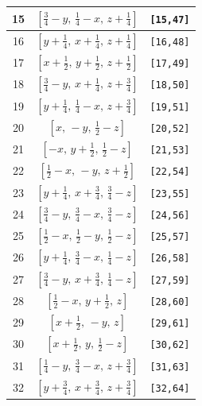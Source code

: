\documentclass[fleqn,8pt]{jsarticle}
\begin{document}
\begin{longtable}{ccc}
15 & $\left[ \frac{3}{4} - y,\, \frac{1}{4} - x,\, z + \frac{1}{4} \right]$ & {\tt [15,47]} \\ \hline
16 & $\left[ y + \frac{1}{4},\, x + \frac{1}{4},\, z + \frac{1}{4} \right]$ & {\tt [16,48]} \\ \hline
17 & $\left[ x + \frac{1}{2},\, y + \frac{1}{2},\, z + \frac{1}{2} \right]$ & {\tt [17,49]} \\ \hline
18 & $\left[ \frac{3}{4} - y,\, x + \frac{1}{4},\, z + \frac{3}{4} \right]$ & {\tt [18,50]} \\ \hline
19 & $\left[ y + \frac{1}{4},\, \frac{1}{4} - x,\, z + \frac{3}{4} \right]$ & {\tt [19,51]} \\ \hline
20 & $\left[ x,\, - y,\, \frac{1}{2} - z \right]$ & {\tt [20,52]} \\ \hline
21 & $\left[ - x,\, y + \frac{1}{2},\, \frac{1}{2} - z \right]$ & {\tt [21,53]} \\ \hline
22 & $\left[ \frac{1}{2} - x,\, - y,\, z + \frac{1}{2} \right]$ & {\tt [22,54]} \\ \hline
23 & $\left[ y + \frac{1}{4},\, x + \frac{3}{4},\, \frac{3}{4} - z \right]$ & {\tt [23,55]} \\ \hline
24 & $\left[ \frac{3}{4} - y,\, \frac{3}{4} - x,\, \frac{3}{4} - z \right]$ & {\tt [24,56]} \\ \hline
25 & $\left[ \frac{1}{2} - x,\, \frac{1}{2} - y,\, \frac{1}{2} - z \right]$ & {\tt [25,57]} \\ \hline
26 & $\left[ y + \frac{1}{4},\, \frac{3}{4} - x,\, \frac{1}{4} - z \right]$ & {\tt [26,58]} \\ \hline
27 & $\left[ \frac{3}{4} - y,\, x + \frac{3}{4},\, \frac{1}{4} - z \right]$ & {\tt [27,59]} \\ \hline
28 & $\left[ \frac{1}{2} - x,\, y + \frac{1}{2},\, z \right]$ & {\tt [28,60]} \\ \hline
29 & $\left[ x + \frac{1}{2},\, - y,\, z \right]$ & {\tt [29,61]} \\ \hline
30 & $\left[ x + \frac{1}{2},\, y,\, \frac{1}{2} - z \right]$ & {\tt [30,62]} \\ \hline
31 & $\left[ \frac{1}{4} - y,\, \frac{3}{4} - x,\, z + \frac{3}{4} \right]$ & {\tt [31,63]} \\ \hline
32 & $\left[ y + \frac{3}{4},\, x + \frac{3}{4},\, z + \frac{3}{4} \right]$ & {\tt [32,64]} \\
\end{longtable}
\end{document}
